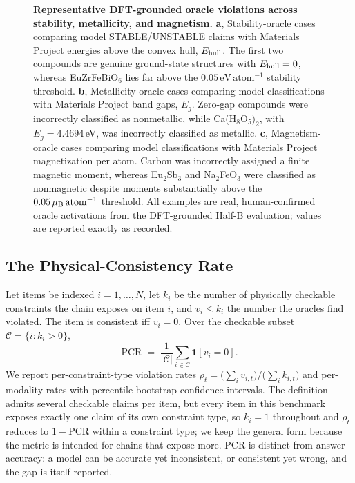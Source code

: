 \documentclass[pdflatex,sn-nature]{sn-jnl}
\begin{document}
\begin{figure}[!htbp]

\caption{\justifying\textbf{Representative DFT-grounded oracle violations across stability, metallicity, and magnetism.}
\textbf{a}, Stability-oracle cases comparing model STABLE/UNSTABLE claims with Materials Project energies above the convex hull, $E_{\rm hull}$. The first two compounds are genuine ground-state structures with $E_{\rm hull}=0$, whereas EuZrFeBiO$_6$ lies far above the $0.05\,\mathrm{eV\,atom^{-1}}$ stability threshold.
\textbf{b}, Metallicity-oracle cases comparing model classifications with Materials Project band gaps, $E_g$. Zero-gap compounds were incorrectly classified as nonmetallic, while Ca(H$_8$O$_5)_2$, with $E_g=4.4694$\,eV, was incorrectly classified as metallic.
\textbf{c}, Magnetism-oracle cases comparing model classifications with Materials Project magnetization per atom. Carbon was incorrectly assigned a finite magnetic moment, whereas Eu$_2$Sb$_3$ and Na$_2$FeO$_3$ were classified as nonmagnetic despite moments substantially above the $0.05\,\mu_{\rm B}\,\mathrm{atom}^{-1}$ threshold. All examples are real, human-confirmed oracle activations from the DFT-grounded Half-B evaluation; values are reported exactly as recorded.}
\label{fig:dft-oracle-cases}
\end{figure}




\subsection*{The Physical-Consistency Rate}
Let items be indexed $i=1,\dots,N$, let $k_i$ be the number of physically checkable
constraints the chain exposes on item $i$, and $v_i \le k_i$ the number the oracles
find violated. The item is consistent iff $v_i=0$. Over the checkable subset
$\mathcal{C}=\{i:k_i>0\}$,
\begin{equation}
\mathrm{PCR} \;=\; \frac{1}{|\mathcal{C}|}\sum_{i\in\mathcal{C}} \mathbf{1}[v_i = 0].
\end{equation}
We report per-constraint-type violation rates
$\rho_t=\big(\sum_i v_{i,t}\big)/\big(\sum_i k_{i,t}\big)$ and per-modality rates with
percentile bootstrap confidence intervals. The definition admits several checkable claims per
item, but every item in this benchmark exposes exactly one claim of its own constraint type,
so $k_i=1$ throughout and $\rho_t$ reduces to $1-\mathrm{PCR}$ within a constraint type; we
keep the general form because the metric is intended for chains that expose more. PCR is distinct from answer accuracy: a
model can be accurate yet inconsistent, or consistent yet wrong, and the gap is
itself reported.
\end{document}
